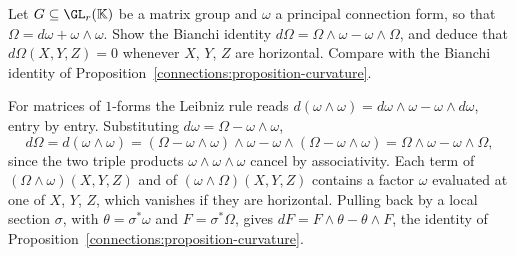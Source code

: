 \begin{exercise}\label{connections:exercise-principal-bianchi}
Let $G \subseteq \GL_r(\mathbb{K})$ be a matrix group and $\omega$ a principal connection form, so that $\Omega = d\omega + \omega \wedge \omega$. Show the Bianchi identity $d\Omega = \Omega \wedge \omega - \omega \wedge \Omega$,
and deduce that $d\Omega(X, Y, Z) = 0$ whenever $X$, $Y$, $Z$ are horizontal. Compare with the Bianchi identity of Proposition~\ref{connections:proposition-curvature}.
\end{exercise}

\begin{solution}
For matrices of $1$-forms the Leibniz rule reads $d(\omega \wedge \omega) = d\omega \wedge \omega - \omega \wedge d\omega$, entry by entry. Substituting $d\omega = \Omega - \omega \wedge \omega$,
\[
d\Omega = d(\omega \wedge \omega) = (\Omega - \omega \wedge \omega) \wedge \omega - \omega \wedge (\Omega - \omega \wedge \omega) = \Omega \wedge \omega - \omega \wedge \Omega,
\]
since the two triple products $\omega \wedge \omega \wedge \omega$ cancel by associativity. Each term of $(\Omega \wedge \omega)(X, Y, Z)$ and of $(\omega \wedge \Omega)(X, Y, Z)$ contains a factor $\omega$
evaluated at one of $X$, $Y$, $Z$, which vanishes if they are horizontal. Pulling back by a local section $\sigma$, with $\theta = \sigma^*\omega$ and $F = \sigma^*\Omega$, gives
$dF = F \wedge \theta - \theta \wedge F$, the identity of Proposition~\ref{connections:proposition-curvature}.
\end{solution}
